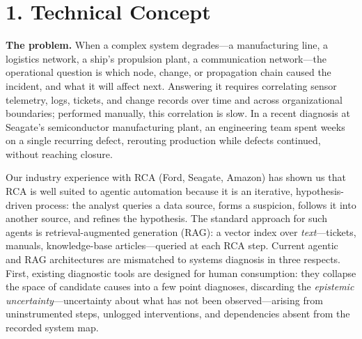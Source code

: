 \documentclass[12pt]{article}
\begin{document}
\section*{1. Technical Concept}

\textbf{The problem.} When a complex system degrades---a manufacturing line, a logistics network, a ship's propulsion plant, a communication network---the operational question is which node, change, or propagation chain caused the incident, and what it will affect next. Answering it requires correlating sensor telemetry, logs, tickets, and change records over time and across organizational boundaries; performed manually, this correlation is slow. In a recent diagnosis at Seagate's semiconductor manufacturing plant, an engineering team spent weeks on a single recurring defect, rerouting production while defects continued, without reaching closure.

Our industry experience with RCA (Ford, Seagate, Amazon) has shown us that RCA is well suited to agentic automation because it is an iterative, hypothesis-driven process: the analyst queries a data source, forms a suspicion, follows it into another source, and refines the hypothesis. The standard approach for such agents is retrieval-augmented generation (RAG): a vector index over \emph{text}---tickets, manuals, knowledge-base articles---queried at each RCA step. Current agentic and RAG architectures are mismatched to systems diagnosis in three respects. First, existing diagnostic tools are designed for human consumption: they collapse the space of candidate causes into a few point diagnoses, discarding the \emph{epistemic uncertainty}---uncertainty about what has not been observed---arising from uninstrumented steps, unlogged interventions, and dependencies absent from the recorded system map.
\end{document}
